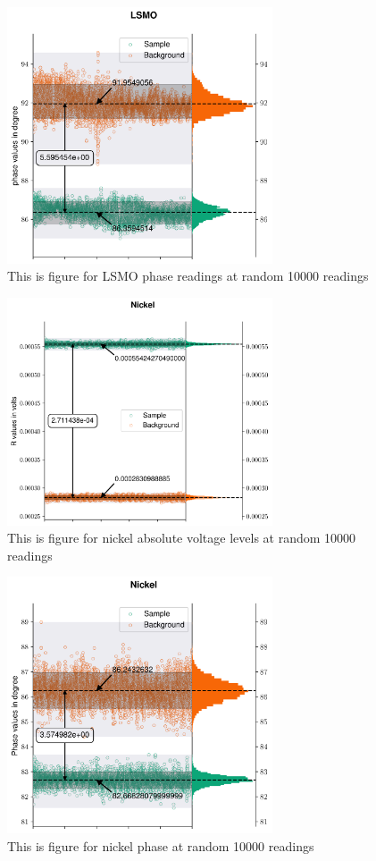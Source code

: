 \documentclass[a4paper,11pt]{article}
\begin{document}
\begin{figure}[hbt!]\center
\includegraphics[width=0.7\textwidth]{LSMOT.png}
\caption{This is figure for LSMO phase  readings at random 10000 readings}
\end{figure}

\begin{figure}[!hbt]\center
\includegraphics[width=0.7\textwidth]{nickelR.png}
\caption{This is figure for nickel absolute voltage levels at random 10000 readings}
\end{figure}

\begin{figure}[!hbt]\center
\includegraphics[width=0.7\textwidth]{nickelT.png}
\caption{This is figure for nickel phase at random 10000 readings}
\end{figure}
\end{document}
